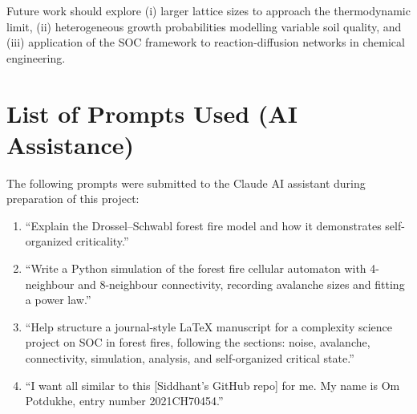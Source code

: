 \documentclass[12pt,a4paper]{article}
\begin{document}
Future work should explore (i) larger lattice sizes to approach the
thermodynamic limit, (ii) heterogeneous growth probabilities modelling
variable soil quality, and (iii) application of the SOC framework to
reaction-diffusion networks in chemical engineering.

\section*{List of Prompts Used (AI Assistance)}

The following prompts were submitted to the Claude AI assistant during
preparation of this project:

\begin{enumerate}
  \item ``Explain the Drossel--Schwabl forest fire model and how it
        demonstrates self-organized criticality.''
  \item ``Write a Python simulation of the forest fire cellular automaton
        with 4-neighbour and 8-neighbour connectivity, recording avalanche
        sizes and fitting a power law.''
  \item ``Help structure a journal-style LaTeX manuscript for a complexity
        science project on SOC in forest fires, following the sections:
        noise, avalanche, connectivity, simulation, analysis, and
        self-organized critical state.''
  \item ``I want all similar to this [Siddhant's GitHub repo] for me.
        My name is Om Potdukhe, entry number 2021CH70454.''
\end{enumerate}


\end{document}
